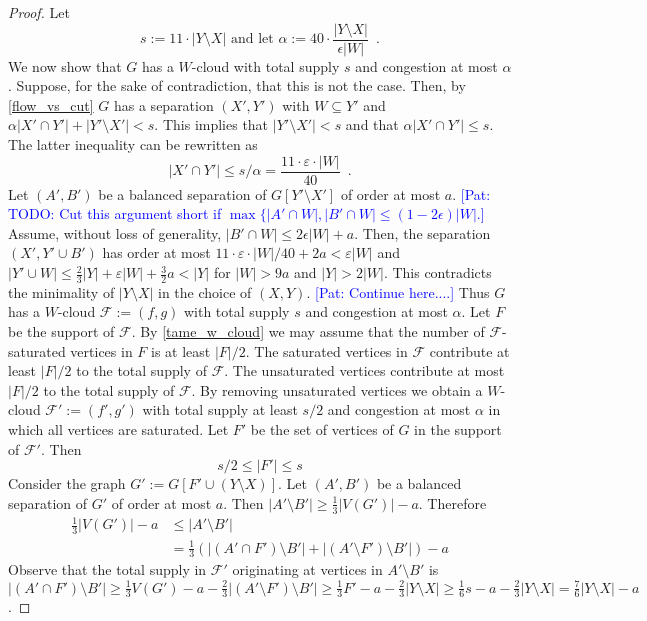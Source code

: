 \documentclass{patmorin}
\newcommand{\pat}[1]{\textcolor{Blue}{[Pat: #1]}}
\begin{document}
\begin{proof}
    Let 
    \[
        s:=11\cdot |Y\setminus X|\text{ and let }\alpha:=40\cdot\frac{|Y\setminus X|}{\epsilon |W|}\enspace.
    \]
    We now show that $G$ has a $W$-cloud with total supply $s$ and congestion at most $\alpha$.  Suppose, for the sake of contradiction, that this is not the case. Then, by \cref{flow_vs_cut} $G$ has a separation $(X',Y')$ with $W\subseteq Y'$ and $\alpha |X'\cap Y'|+|Y'\setminus X'|< s$.  This implies that $|Y'\setminus X'|<s$ and that  $\alpha|X'\cap Y'|\le s$.  The latter inequality can be rewritten as
    \[
        |X'\cap Y'|\le s/\alpha = \frac{11\cdot\varepsilon\cdot|W|}{40} \enspace .
    \]
    Let $(A',B')$ be a balanced separation of $G[Y'\setminus X']$ of order at most $a$.  
    \pat{TODO: Cut this argument short if $\max\{|A'\cap W|,|B'\cap W|\le (1-2\epsilon)|W|$.}
    Assume, without loss of generality, $|B'\cap W|\le 2\epsilon|W|+a$.  Then, the separation $(X',Y'\cup B')$ has order at most $11\cdot\varepsilon\cdot|W|/40+2a<\varepsilon|W|$ and $|Y'\cup W|\le \tfrac{2}{3}|Y|+\varepsilon|W|+\tfrac{3}{2}a< |Y|$ for $|W|>9a$ and $|Y|>2|W|$.  This contradicts the minimality of $|Y\setminus X|$ in the choice of $(X,Y)$.
    \pat{Continue here....}
    Thus $G$ has a $W$-cloud $\mathcal{F}:=(f,g)$ with total supply $s$ and congestion at most $\alpha$.  Let $F$ be the support of $\mathcal{F}$.  By \cref{tame_w_cloud} we may assume that the number of $\mathcal{F}$-saturated vertices in $F$ is at least $|F|/2$.  The saturated vertices in $\mathcal{F}$ contribute at least $|F|/2$ to the total supply of $\mathcal{F}$.  The unsaturated vertices contribute at most $|F|/2$ to the total supply of $\mathcal{F}$.  By removing unsaturated vertices we obtain a $W$-cloud $\mathcal{F}':=(f',g')$ with total supply at least $s/2$ and congestion at most $\alpha$ in which all vertices are saturated.
    Let $F'$ be the set of vertices of $G$ in the support of $\mathcal{F}'$.  Then
    \[   
      s/2 \le |F'| \le s 
    \]
    Consider the graph $G':=G[F'\cup (Y\setminus X)]$.  Let $(A',B')$ be a balanced separation of $G'$ of order at most $a$.  Then $|A'\setminus B'|\ge \tfrac{1}{3}|V(G')|-a$.  Therefore
    \begin{align*}
      \tfrac{1}{3}|V(G')|- a 
      & \le |A'\setminus B'| \\
      & =  \tfrac{1}{3}\left(|(A'\cap F')\setminus B'|+ |(A'\setminus F')\setminus B'|\right)-a     
    \end{align*}
    Observe that the total supply in $\mathcal{F}'$ originating at vertices in $A'\setminus B'$ is $|(A'\cap F')\setminus B'|\ge \tfrac{1}{3}V(G')-a-\tfrac{2}{3}|(A'\setminus F')\setminus B'|\ge \tfrac{1}{3}F'-a-\tfrac{2}{3}|Y\setminus X|\ge \tfrac{1}{6}s-a-\tfrac{2}{3}|Y\setminus X|=\frac{7}{6}|Y\setminus X|-a$.   
    

\end{proof}
\end{document}
